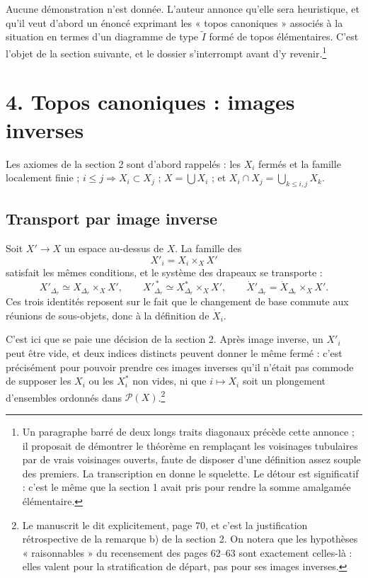 \documentclass[11pt,a4paper]{article}
\begin{document}
Aucune démonstration n'est donnée. L'auteur annonce qu'elle sera heuristique, et
qu'il veut d'abord un énoncé exprimant les « topos canoniques » associés à la
situation en termes d'un diagramme de type $\widetilde{I}$ formé de topos
élémentaires. C'est l'objet de la section suivante, et le dossier s'interrompt
avant d'y revenir.\footnote{Un paragraphe barré de deux longs traits diagonaux
précède cette annonce ; il proposait de démontrer le théorème en remplaçant les
voisinages tubulaires par de vrais voisinages ouverts, faute de disposer d'une
définition assez souple des premiers. La transcription en donne le squelette. Le
détour est significatif : c'est le même que la section 1 avait pris pour rendre
la somme amalgamée élémentaire.}

\section*{4. Topos canoniques : images inverses}

Les axiomes de la section 2 sont d'abord rappelés : les $X_{i}$ fermés et la
famille localement finie ; $i \leq j \Rightarrow X_{i} \subset X_{j}$ ;
$X = \bigcup X_{i}$ ; et $X_{i} \cap X_{j} = \bigcup_{k \leq i,j} X_{k}$.

\subsection*{Transport par image inverse}

Soit $X' \to X$ un espace au-dessus de $X$. La famille des
\[
  X'_{i} = X_{i} \times_{X} X'
\]
satisfait les mêmes conditions, et le système des drapeaux se transporte :
\[
  X'_{\Delta_{r}} \simeq X_{\Delta_{r}} \times_{X} X', \qquad
  X'^{\,*}_{\Delta_{r}} \simeq X^{*}_{\Delta_{r}} \times_{X} X', \qquad
  \dot{X}'_{\Delta_{r}} = \dot{X}_{\Delta_{r}} \times_{X} X'.
\]
Ces trois identités reposent sur le fait que le changement de base commute aux
réunions de sous-objets, donc à la définition de $\dot{X}_{i}$.

C'est ici que se paie une décision de la section 2. Après image inverse, un
$X'_{i}$ peut être vide, et deux indices distincts peuvent donner le même fermé :
c'est précisément pour pouvoir prendre ces images inverses qu'il n'était pas
commode de supposer les $X_{i}$ ou les $X_{i}^{*}$ non vides, ni que
$i \mapsto X_{i}$ soit un plongement d'ensembles ordonnés dans
$\mathcal{P}(X)$.\footnote{Le manuscrit le dit explicitement, page 70, et c'est
la justification rétrospective de la remarque b) de la section 2. On notera que
les hypothèses « raisonnables » du recensement des pages 62--63 sont exactement
celles-là : elles valent pour la stratification de départ, pas pour ses images
inverses.}
\end{document}
